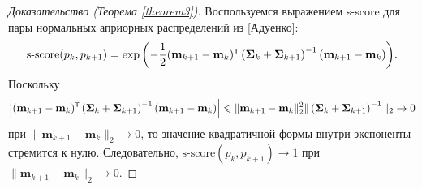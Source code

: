 \begin{proof}[Доказательство (Теорема \ref{theorem3})]
    Воспользуемся выражением s-score для пары нормальных априорных распределений из [Адуенко]:
    \[ \text{s-score}(p_k, p_{k+1}) = \exp{\left( -\dfrac{1}{2} (\mathbf{m}_{k+1} - \mathbf{m}_k)\T \left( \mathbf{\Sigma}_k + \mathbf{\Sigma}_{k+1} \right)^{-1} (\mathbf{m}_{k+1} - \mathbf{m}_k) \right)}. \]
    Поскольку
    \[ \left| (\mathbf{m}_{k+1} - \mathbf{m}_k)\T \left( \mathbf{\Sigma}_k + \mathbf{\Sigma}_{k+1} \right)^{-1} (\mathbf{m}_{k+1} - \mathbf{m}_k) \right| \leqslant \| \mathbf{m}_{k+1} - \mathbf{m}_k \|_2^2 \| \left( \mathbf{\Sigma}_k + \mathbf{\Sigma}_{k+1} \right)^{-1} \|_2 \to 0 \]
    при $\| \mathbf{m}_{k+1} - \mathbf{m}_k \|_2 \to 0$, то значение квадратичной формы внутри экспоненты стремится к нулю. Следовательно, $\text{s-score}(p_k, p_{k+1}) \to 1$ при $\| \mathbf{m}_{k+1} - \mathbf{m}_k \|_2 \to 0$.
\end{proof}

